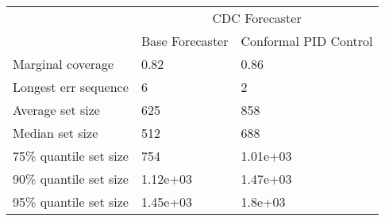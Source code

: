 \begin{tabular}{lll}
\toprule
& \multicolumn{2}{c}{CDC Forecaster} \\
& Base Forecaster & Conformal PID Control \\
\midrule
Marginal coverage & 0.82 & 0.86 \\
Longest err sequence & 6 & 2 \\
Average set size & 625 & 858 \\
Median set size & 512 & 688 \\
75\% quantile set size & 754 & 1.01e+03 \\
90\% quantile set size & 1.12e+03 & 1.47e+03 \\
95\% quantile set size & 1.45e+03 & 1.8e+03 \\
\bottomrule
\end{tabular}
